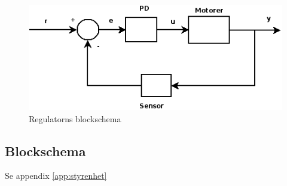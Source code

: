 \begin{figure}[H]
        \label{regulator}
        \begin{center}
                \includegraphics[scale=0.7]{bilder/regulator.png}
        \end{center}
        \caption{Regulatorns blockschema}
\end{figure}

\subsection{Blockschema}
Se appendix \ref{app:styrenhet}
